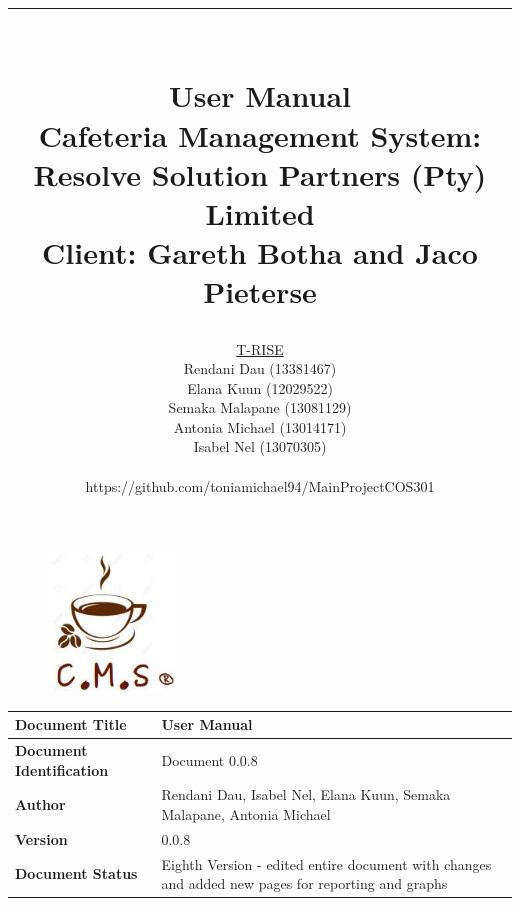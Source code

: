 \documentclass[a4paper,12pt]{report}
\title{ \rule{\textwidth}{1pt}  \\ \Huge User Manual \\ 
	\Large Cafeteria Management System: Resolve Solution Partners (Pty) Limited \\
	\small Client: Gareth Botha and Jaco Pieterse}
\author{ 
         \underline{T-RISE}\\
          Rendani Dau (13381467) \\
	Elana Kuun (12029522) \\
	Semaka Malapane (13081129) \\
	Antonia Michael (13014171) \\
	Isabel Nel (13070305) \\ \\
	https://github.com/toniamichael94/MainProjectCOS301 \\ }
\date{\today \\ \rule{\textwidth}{1pt}}
\begin{document}
\maketitle
\break

\tableofcontents
\break

\begin{figure}[H]
  \centering
   \includegraphics[width=0.3\textwidth]{../images/cmslogo.jpg} 
\end{figure}
 \begin{tabu} to 0.8\textwidth { | X[l] | X[l] | }
 \hline
 \textbf{Document Title} & User Manual \\
 \hline
 \textbf{Document Identification}  & Document 0.0.8  \\
 \hline
 \textbf{Author}  & Rendani Dau, Isabel Nel, Elana Kuun, Semaka Malapane, Antonia Michael \\
 \hline
 \textbf{Version} & 0.0.8 \\
 \hline
 \textbf{Document Status} & Eighth Version - edited entire document with changes and added new pages for reporting and graphs\\
 \hline
 \end{tabu}
\end{document}
